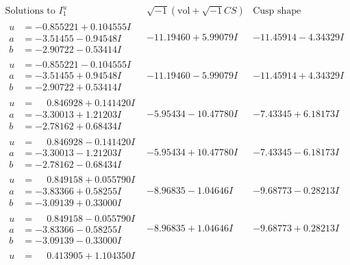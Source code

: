 \documentclass[1p]{elsarticle_modified}
\theoremstyle{definition}
\newcommand{\I}{\sqrt{-1}}
\begin{document}
$$\begin{array}{c|c|c}  
\text{Solutions to }I^u_{1}& \I (\text{vol} + \sqrt{-1}CS) & \text{Cusp shape}\\
 \hline 
\begin{aligned}
u &= -0.855221 + 0.104555 I \\
a &= -3.51455 - 0.94548 I \\
b &= -2.90722 - 0.53414 I\end{aligned}
 & -11.19460 + 5.99079 I & -11.45914 - 4.34329 I \\ \hline\begin{aligned}
u &= -0.855221 - 0.104555 I \\
a &= -3.51455 + 0.94548 I \\
b &= -2.90722 + 0.53414 I\end{aligned}
 & -11.19460 - 5.99079 I & -11.45914 + 4.34329 I \\ \hline\begin{aligned}
u &= \phantom{-}0.846928 + 0.141420 I \\
a &= -3.30013 + 1.21203 I \\
b &= -2.78162 + 0.68434 I\end{aligned}
 & -5.95434 - 10.47780 I & -7.43345 + 6.18173 I \\ \hline\begin{aligned}
u &= \phantom{-}0.846928 - 0.141420 I \\
a &= -3.30013 - 1.21203 I \\
b &= -2.78162 - 0.68434 I\end{aligned}
 & -5.95434 + 10.47780 I & -7.43345 - 6.18173 I \\ \hline\begin{aligned}
u &= \phantom{-}0.849158 + 0.055790 I \\
a &= -3.83366 + 0.58255 I \\
b &= -3.09139 + 0.33000 I\end{aligned}
 & -8.96835 - 1.04646 I & -9.68773 - 0.28213 I \\ \hline\begin{aligned}
u &= \phantom{-}0.849158 - 0.055790 I \\
a &= -3.83366 - 0.58255 I \\
b &= -3.09139 - 0.33000 I\end{aligned}
 & -8.96835 + 1.04646 I & -9.68773 + 0.28213 I \\ \hline\begin{aligned}
u &= \phantom{-}0.413905 + 1.104350 I \\

\end{aligned}
\end{array}$$
\end{document}
